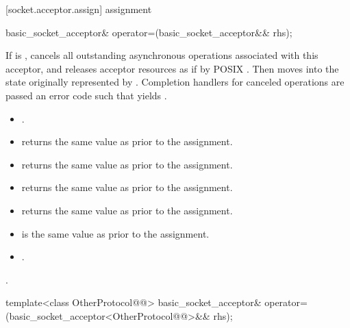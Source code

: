 [socket.acceptor.assign]{ assignment}

\begin{itemdecl}
basic_socket_acceptor& operator=(basic_socket_acceptor&& rhs);
\end{itemdecl}

\begin{itemdescr}
\pnum
\effects If  is , cancels all outstanding asynchronous operations associated with this acceptor, and releases acceptor resources as if by POSIX . Then moves into  the state originally represented by . Completion handlers for canceled operations are passed an error code  such that  yields .

\pnum
\postconditions
\begin{itemize}
\item
{}.
\item
{} returns the same value as  prior to the assignment.
\item
{} returns the same value as  prior to the assignment.
\item
{} returns the same value as  prior to the assignment.
\item
{} returns the same value as  prior to the assignment.
\item
{} is the same value as  prior to the assignment.
\item
{}.
\end{itemize}

\pnum
\returns {}.
\end{itemdescr}

\begin{itemdecl}
template<class OtherProtocol@@>
  basic_socket_acceptor& operator=(basic_socket_acceptor<OtherProtocol@@>&& rhs);
\end{itemdecl}

